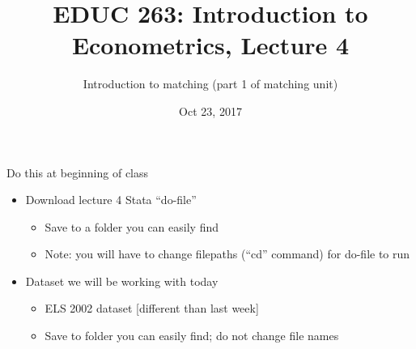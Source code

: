 
 

%


\title[EDUC 263, Lecture 4] {EDUC 263: Introduction to Econometrics, Lecture 4}
\subtitle{Introduction to matching (part 1 of matching unit)}
\date{Oct 23, 2017}



\begin{frame}{Do this at beginning of class}

\vspace{3mm}	
	\begin{itemize}
	
		\item Download lecture 4 Stata ``do-file'' \href{https://www.dropbox.com/s/1hhixp495qrh0ws/intro-econometrics-lecture-4-do-file.do?dl=0}{}
		\begin{itemize}
			\item Save to a folder you can easily find
			\item Note: you will have to change filepaths (``cd'' command) for do-file to run
		\end{itemize}
	
		\item Dataset we will be working with today
		\begin{itemize}
			\item ELS 2002 dataset [different than last week] \href{https://www.dropbox.com/s/ihjk5g54udjx78e/effect_cc_on_ba_dataset.dta?dl=0}{}
			\item Save to folder you can easily find; do not change file names			

		\end{itemize}
		
	\end{itemize}
\end{frame}

	
\begin{frame}
	\titlepage
\end{frame}

